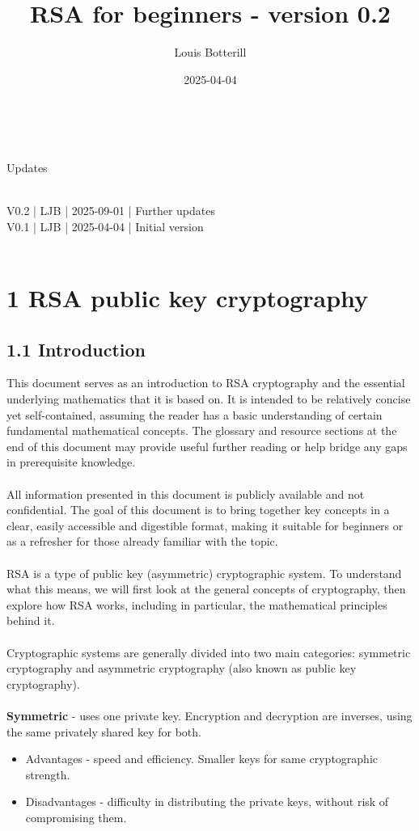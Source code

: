 \documentclass[11pt]{article}   	%
\title{RSA for beginners - version 0.2}
\author{Louis Botterill}
\date{2025-04-04}					%
\begin{document}
\maketitle
\
\begin{center}
Updates \\
\

\end{center} 

\begin{center}
\parbox{8cm}{
V0.2 | LJB | 2025-09-01 | Further updates \\
V0.1 | LJB | 2025-04-04 | Initial version  \\
\\
}
\end{center}

\pagebreak

\section*{1 RSA public key cryptography}

\subsection*{1.1 Introduction}

This document serves as an introduction to RSA cryptography and the essential underlying mathematics that it is based on. It is intended to be relatively concise yet self-contained, assuming the reader has a basic understanding of certain fundamental mathematical concepts. The glossary and resource sections at the end of this document may provide useful further reading or help bridge any gaps in prerequisite knowledge. \\
\\
All information presented in this document is publicly available and not confidential. The goal of this document is to bring together key concepts in a clear, easily accessible  and digestible format, making it suitable for beginners or as a refresher for those already familiar with the topic. \\
\\
RSA is a type of public key (asymmetric) cryptographic system. To understand what this means, we will first look at the general concepts of cryptography, then explore how RSA works, including in particular, the mathematical principles behind it. \\
\\
Cryptographic systems are generally divided into two main categories: symmetric cryptography and asymmetric cryptography (also known as public key cryptography). \\
\\
\textbf{Symmetric} - uses one private key. Encryption and decryption are inverses, using the same privately shared key for both.
\begin{itemize}
 \item Advantages - speed and efficiency. Smaller keys for same cryptographic strength.
 \item Disadvantages - difficulty in distributing the private keys, without risk of compromising them.
\end{itemize}
\end{document}
